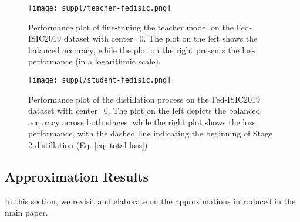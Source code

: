 \begin{figure}
    \centering
    \texttt{[image: suppl/teacher-fedisic.png]}
    \caption{Performance plot of fine-tuning the teacher model on the Fed-ISIC2019 dataset with center=0. The plot on the left shows the balanced accuracy, while the plot on the right presents the loss performance (in a logarithmic scale).}
    \label{fig: teacher-fedisic} 
\end{figure}

\begin{figure}
    \centering
    \texttt{[image: suppl/student-fedisic.png]}
    \caption{Performance plot of the distillation process on the Fed-ISIC2019 dataset with center=0. The plot on the left depicts the balanced accuracy across both stages, while the right plot shows the loss performance, with the dashed line indicating the beginning of Stage 2 distillation (Eq. \ref{eq: total-loss}).} 
    \label{fig: student-fedisic}
\end{figure}

\subsection{Approximation Results} 
In this section, we revisit and elaborate on the approximations introduced in the main paper. 

\begin{table*}[h]
    \centering
    \caption{\textbf{Softmax approximation results.} Latency is computed per a batch of samples, when batch size is set to $8$. One-epoch accuracy refers to the accuracy we obtain when performing one full pass over the data for only one epoch. This experiment is carried on the Fed-ISIC2019(center=0) dataset. }
    \label{tab: softmax-approximations}
\end{table*}

